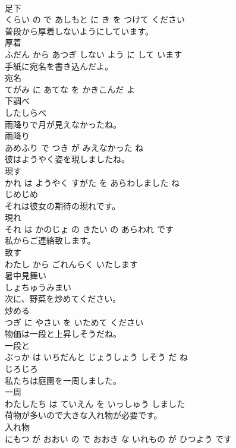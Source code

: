\documentclass[8pt]{extreport}
\begin{document}
\begin{CJK}{UTF8}{min}
\\	足下 
\\	くらい の で あしもと に き を つけて ください			
\\	普段から厚着しないようにしています。	
\\	厚着 
\\	ふだん から あつぎ しない よう に して います			
\\	手紙に宛名を書き込んだよ。	
\\	宛名 
\\	てがみ に あてな を かきこんだ よ			
\\	下調べ	
\\	したしらべ			
\\	雨降りで月が見えなかったね。	
\\	雨降り 
\\	あめふり で つき が みえなかった ね			
\\	彼はようやく姿を現しましたね。	
\\	現す 
\\	かれ は ようやく すがた を あらわしました ね			
\\	じめじめ	
\\	それは彼女の期待の現れです。	
\\	現れ 
\\	それ は かのじょ の きたい の あらわれ です			
\\	私からご連絡致します。	
\\	致す 
\\	わたし から ごれんらく いたします			
\\	暑中見舞い	
\\	しょちゅうみまい			
\\	次に、野菜を炒めてください。	
\\	炒める 
\\	つぎ に やさい を いためて ください			
\\	物価は一段と上昇しそうだね。	
\\	一段と 
\\	ぶっか は いちだんと じょうしょう しそう だ ね			
\\	じろじろ	
\\	私たちは庭園を一周しました。	
\\	一周 
\\	わたしたち は ていえん を いっしゅう しました			
\\	荷物が多いので大きな入れ物が必要です。	
\\	入れ物 
\\	にもつ が おおい の で おおき な いれもの が ひつよう です			

\end{CJK}
\end{document}

